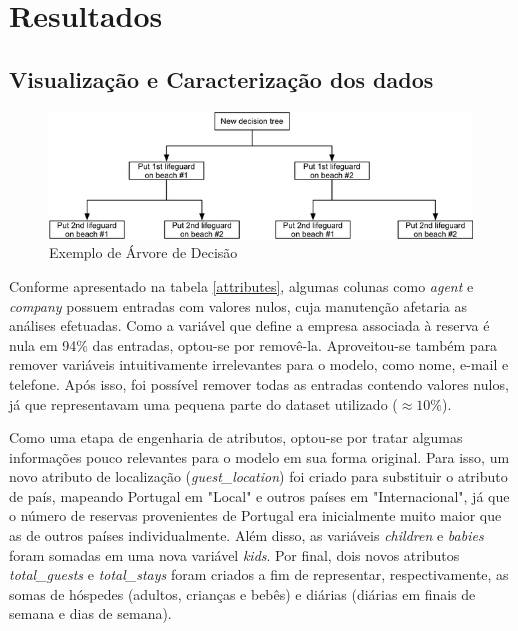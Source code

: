 \documentclass{homework}
\begin{document}
\section{Resultados}
\label{resultados}

\subsection{Visualização e Caracterização dos dados}

\begin{figure}[htbp]
    \centerline{\includegraphics[scale=2]{decision_tree.png}}
    \label{decision_tree}
    \caption{Exemplo de Árvore de Decisão \cite{decision_tree}}
\end{figure}

Conforme apresentado na tabela \ref{attributes}, algumas colunas como \textit{agent} e \textit{company} possuem entradas
com valores nulos, cuja manutenção afetaria as análises efetuadas. Como a variável que define a empresa associada à
reserva é nula em 94\% das entradas, optou-se por removê-la. Aproveitou-se também para remover variáveis intuitivamente
irrelevantes para o modelo, como nome, e-mail e telefone. Após isso, foi possível remover todas as entradas contendo
valores nulos, já que representavam uma pequena parte do dataset utilizado ($\approx10\%$).

Como uma etapa de engenharia de atributos, optou-se por tratar algumas informações pouco relevantes para o modelo em sua
forma original. Para isso, um novo atributo de localização (\textit{guest\_location}) foi criado para substituir o
atributo de país, mapeando Portugal em "Local" e outros países em "Internacional", já que o número de reservas
provenientes de Portugal era inicialmente muito maior que as de outros países individualmente. Além disso, as variáveis
\textit{children} e \textit{babies} foram somadas em uma nova variável \textit{kids}. Por final, dois novos atributos
\textit{total\_guests} e \textit{total\_stays} foram criados a fim de representar, respectivamente, as somas de hóspedes
(adultos, crianças e bebês) e diárias (diárias em finais de semana e dias de semana).
\end{document}
